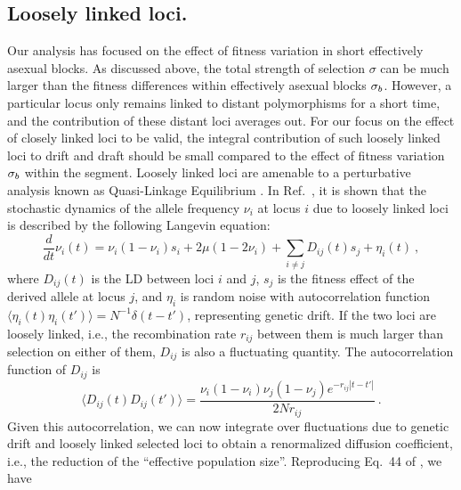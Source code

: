\subsection*{Loosely linked loci.}
Our analysis has focused on the effect of fitness variation in
short effectively asexual blocks. As discussed above, the total
strength of selection $\sigma$ can be much larger than the fitness
differences within effectively asexual blocks ${\sigma_b}$. However,
a particular locus only remains linked to distant polymorphisms
for a short time, and the contribution of these distant loci
averages out. For our focus on the effect of closely linked loci to be
valid, the integral contribution of such loosely linked loci 
to drift and draft should be small compared to the effect of
fitness variation ${\sigma_b}$ within the segment.
Loosely linked loci are amenable to a
perturbative analysis known as Quasi-Linkage Equilibrium
\cite{Kimura:1965p3008,Barton:1991p2659,Neher:2011p45096}. In
Ref.~\cite{Neher:2011p45096}, it is shown that the stochastic dynamics of
the allele frequency $\nu_i$ at locus $i$ due to loosely linked loci is
described by the following Langevin equation:
\begin{equation}
  \label{eq:allele_langevin}
  \frac{d}{dt}\nu_i(t) = \nu_i(1-\nu_i) s_i +2\mu(1-2\nu_i) + \sum_{i\neq
    j}D_{ij}(t)s_j + \eta_i(t) \ ,
\end{equation}
where $D_{ij}(t)$ is the LD between loci $i$ and $j$, $s_j$ is the
fitness effect of the derived allele at locus $j$, and $\eta_i$ is
random noise with autocorrelation function $\langle
\eta_i(t)\eta_i(t')\rangle =N^{-1}\delta(t-t')$, representing genetic
drift. 
If the two loci are loosely linked, i.e., the
recombination rate $r_{ij}$ between them is much larger than selection on either
of them, $D_{ij}$  is also a fluctuating quantity. 
The autocorrelation function of $D_{ij}$ is \cite{Neher:2011p45096}
\begin{equation}
  \label{eq:LD_autocorr}
  \langle D_{ij}(t)D_{ij}(t')\rangle = \frac{\nu_i(1-\nu_i)\nu_j(1-\nu_j)e^{-r_{ij}|t-t'|}}{2Nr_{ij}} \ .
\end{equation}
Given this autocorrelation, we can now integrate over fluctuations due
to genetic drift and loosely linked selected loci to obtain a
renormalized diffusion coefficient, i.e., the reduction of the
``effective population size''. Reproducing Eq.~44 of
\cite{Neher:2011p45096}, we have
